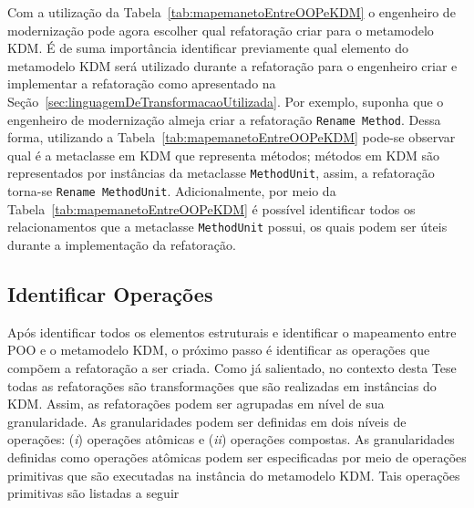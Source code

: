 Com a utilização da Tabela~\ref{tab:mapemanetoEntreOOPeKDM} o engenheiro de modernização pode agora escolher qual refatoração criar para o metamodelo KDM. É de suma importância identificar previamente qual elemento do metamodelo KDM será utilizado durante a refatoração para o engenheiro criar e implementar a refatoração como apresentado na Seção~\ref{sec:linguagemDeTransformacaoUtilizada}. Por exemplo, suponha que o engenheiro de modernização almeja criar a refatoração \texttt{Rename Method}. Dessa forma, utilizando a Tabela~\ref{tab:mapemanetoEntreOOPeKDM} pode-se observar qual é a metaclasse em KDM que representa métodos; métodos em KDM são representados por instâncias da metaclasse \texttt{MethodUnit}, assim, a refatoração torna-se \texttt{Rename MethodUnit}. Adicionalmente, por meio da Tabela~\ref{tab:mapemanetoEntreOOPeKDM} é possível identificar todos os relacionamentos que a metaclasse \texttt{MethodUnit} possui, os quais podem ser úteis durante a implementação da refatoração.


\subsection{Identificar Operações}\label{sec:refatoracao_para_o_metamodelo_kdm}

Após identificar todos os elementos estruturais e identificar o mapeamento entre POO e o metamodelo KDM, o próximo passo é identificar as operações que compõem a refatoração a ser criada. Como já salientado, no contexto desta Tese todas as refatorações são transformações que são realizadas em instâncias do KDM. Assim, as refatorações podem ser agrupadas em nível de sua granularidade. As granularidades podem ser definidas em dois níveis de operações: (\textit{i}) operações atômicas e (\textit{ii}) operações compostas. As granularidades definidas como operações atômicas podem ser especificadas por meio de operações primitivas que são executadas na instância do metamodelo KDM. Tais operações primitivas são listadas a seguir




